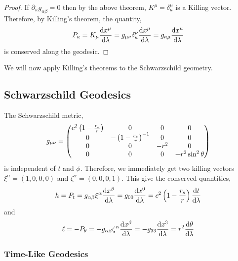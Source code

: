\documentclass[11pt, a4paper]{article}
\begin{document}
\begin{proof}
If $\partial_{\kappa} g_{\alpha \beta} = 0$ then by the above theorem, $K^\mu = \delta^{\mu}_{\kappa}$ is a Killing vector. Therefore, by Killing's theorem, the quantity,
\[ P_\kappa = K_{\mu} \frac{\mathrm{d}x^{\mu}}{\mathrm{d}\lambda} = g_{\mu \nu} \delta^{\nu}_{\kappa} \frac{\mathrm{d}x^{\mu}}{\mathrm{d}\lambda} = g_{\kappa \mu} \frac{\mathrm{d}x^{\mu}}{\mathrm{d}\lambda}\]
is conserved along the geodesic.
\end{proof}

We will now apply Killing's theorems to the Schwarzschild geometry.

\subsection{Schwarzschild Geodesics}
The Schwarzschild metric,
\[ g_{\mu \nu}
= 
\begin{pmatrix}
c^2 \left(1 - \frac{r_s}{r} \right) & 0 & 0 & 0 \\
0 & - \left(1 - \frac{r_s}{r} \right)^{-1} & 0 & 0 \\
0 & 0 & - r^2 & 0 \\
0 & 0 & 0 & - r^2 \sin^2{\theta}
\end{pmatrix}
\]
is independent of $t$ and $\phi$. Therefore, we immediately get two killing vectors $\xi^\alpha = (1, 0, 0, 0)$ and $\zeta^\alpha = (0, 0, 0, 1)$. This give the conserved quantities,
\[ h = P_t = g_{\alpha \beta} \xi^\alpha \frac{\mathrm{d}x^\beta}{\mathrm{d}\lambda} = g_{0 0} \frac{\mathrm{d}x^0}{\mathrm{d}\lambda} = c^2 \left(1 - \frac{r_s}{r} \right) \frac{\mathrm{d}t}{\mathrm{d}\lambda} \]
and 
\[ \ell = - P_\theta = - g_{\alpha \beta} \zeta^\alpha \frac{\mathrm{d}x^\beta}{\mathrm{d}\lambda} = - g_{3 3} \frac{\mathrm{d}x^3}{\mathrm{d}\lambda} = r^2 \frac{\mathrm{d}\theta}{\mathrm{d}\lambda} \]

\subsubsection{Time-Like Geodesics}
\end{document}
